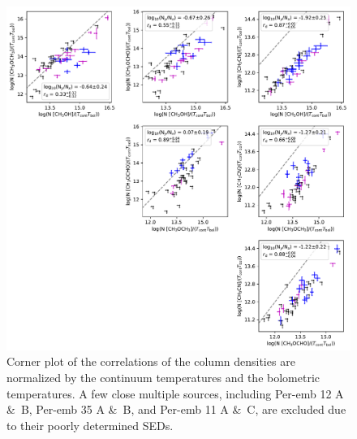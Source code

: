 \documentclass[twocolumn]{aastex62}
\begin{document}
\addtocounter{figure}{-1}
\begin{figure}[htbp!]
  \centering
  \includegraphics[width=\textwidth]{corner_Ncol_correlations_norm_Tcont+Tbol.pdf}
  \caption{Corner plot of the correlations of the column densities are normalized by the continuum temperatures and the bolometric temperatures.  A few close multiple sources, including Per-emb 12 A \&\ B, Per-emb 35 A \&\ B, and Per-emb 11 A \&\ C, are excluded due to their poorly determined SEDs.}
  \label{fig:corner_tbol}
\end{figure}
\renewcommand{\thefigure}{\arabic{figure}}
\end{document}
